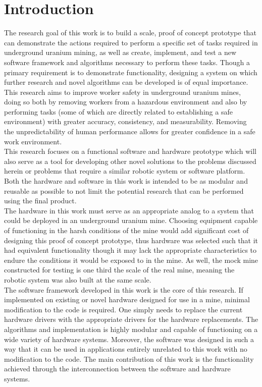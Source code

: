 \chapter{Introduction}
\label{chap:introduction}

The research goal of this work is to build a scale, proof of concept prototype that can demonstrate the actions required to perform a specific set of tasks required in underground uranium mining, as well as create, implement, and test a new software framework and algorithms necessary to perform these tasks. Though a primary requirement is to demonstrate functionality, designing a system on which further research and novel algorithms can be developed is of equal importance. This research aims to improve worker safety in underground uranium mines, doing so both by removing workers from a hazardous environment and also by performing tasks (some of which are directly related to establishing a safe environment) with greater accuracy, consistency, and measurability. Removing the unpredictability of human performance allows for greater confidence in a safe work environment.\\

This research focuses on a functional software and hardware prototype which will also serve as a tool for developing other novel solutions to the problems discussed herein or problems that require a similar robotic system or software platform. Both the hardware and software in this work is intended to be as modular and reusable as possible to not limit the potential research that can be performed using the final product.\\

The hardware in this work must serve as an appropriate analog to a system that could be deployed in an underground uranium mine. Choosing equipment capable of functioning in the harsh conditions of the mine would add significant cost of designing this proof of concept prototype, thus hardware was selected such that it had equivalent functionality though it may lack the appropriate characteristics to endure the conditions it would be exposed to in the mine. As well, the mock mine constructed for testing is one third the scale of the real mine, meaning the robotic system was also built at the same scale.\\

The software framework developed in this work is the core of this research. If implemented on existing or novel hardware designed for use in a mine, minimal modification to the code is required. One simply needs to replace the current hardware drivers with the appropriate drivers for the hardware replacements. The algorithms and implementation is highly modular and capable of functioning on a wide variety of hardware systems. Moreover, the software was designed in such a way that it can be used in applications entirely unrelated to this work with no modification to the code. The main contribution of this work is the functionality achieved through the interconnection between the software and hardware systems.
